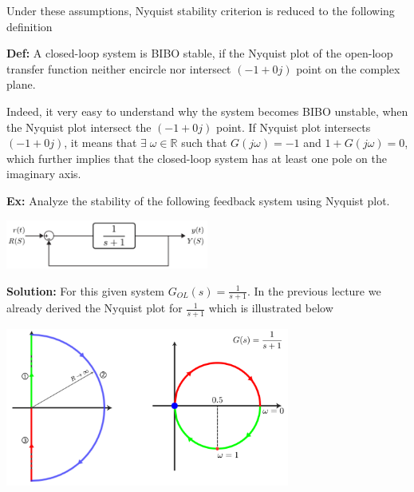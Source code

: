 \documentclass{article}
\begin{document}
Under these assumptions, Nyquist stability criterion is reduced to the
following definition 

\vspace{3pt}

\textbf{Def:} A closed-loop system is BIBO stable, if the Nyquist plot
of the open-loop transfer function neither encircle nor intersect $(-1
+ 0 j )$ point on the complex plane. 

\vspace{3pt}

Indeed, it very easy to understand why the system becomes BIBO
unstable, when the Nyquist plot intersect the $(-1 + 0 j )$ point. If
Nyquist plot intersects $(-1 + 0 j )$, it means that $\exists \;
\omega \in \mathbb{R}$ such that $G(j \omega) = -1$ and $1 + G(j \omega) = 0$, 
which further implies that the closed-loop system has at least one 
pole on the imaginary axis. 

\newpage

\textbf{Ex:} Analyze the stability of the following feedback system
using Nyquist plot.

\vspace{6 pt}

  \begin{minipage}[h]{1\linewidth}
    \begin{center}
      \includegraphics[width=0.5\textwidth]{ex1block}
    \end{center}
  \end{minipage}

\vspace{6 pt}

\textbf{Solution:} For this given system $G_{OL}(s) = \frac{1}{s+1}$.
In the previous lecture we already derived the Nyquist plot for $\frac{1}{s+1}$
which is illustrated below

\vspace{6 pt}

  \begin{minipage}[h]{1\linewidth}
    \begin{center}
      \includegraphics[width=0.7\textwidth]{ex2}
    \end{center}
  \end{minipage}
\end{document}
